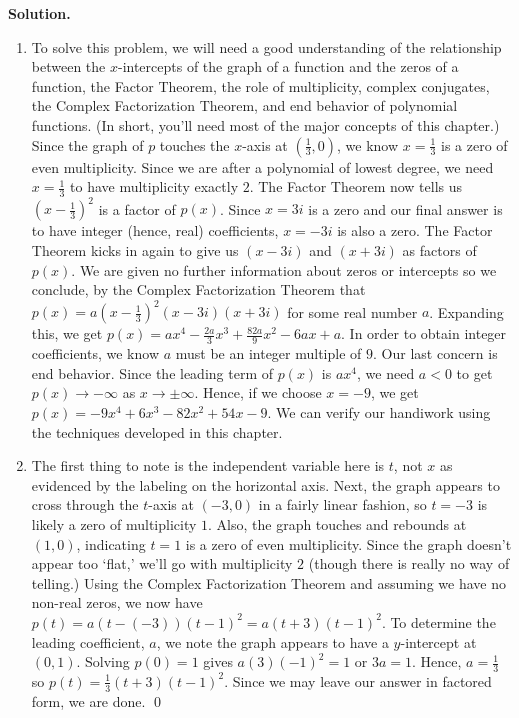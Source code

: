 \begin{ex}
{\bf Solution.}  

\begin{enumerate}

\item To solve this problem, we will need a good understanding of the relationship between the $x$-intercepts of the graph of a function and the zeros of a function, the Factor Theorem, the role of multiplicity, complex conjugates, the Complex Factorization Theorem, and end behavior of polynomial functions.  (In short, you'll need most of the major concepts of this chapter.)  Since the graph of $p$ touches the $x$-axis at $\left(\frac{1}{3}, 0\right)$, we know $x=\frac{1}{3}$ is a zero of even multiplicity.  Since we are after a polynomial of lowest degree, we need $x=\frac{1}{3}$ to have multiplicity exactly $2$. The Factor Theorem now tells us  $\left(x-\frac{1}{3}\right)^2$ is a factor of $p(x)$.  Since $x=3i$ is a zero and our final answer is to have integer (hence, real) coefficients, $x=-3i$ is also a zero.  The Factor Theorem kicks in again to give us $(x-3i)$ and $(x+3i)$ as factors of $p(x)$.  We are given no further information about zeros or intercepts so we conclude, by the Complex Factorization Theorem that $p(x) = a \left(x-\frac{1}{3}\right)^2 (x-3i)(x+3i)$ for some real number $a$.  Expanding this, we get $p(x) =  ax^4-\frac{2a}{3} x^3+\frac{82a}{9} x^2-6ax+a$.  In order to obtain integer coefficients, we know $a$ must be an integer multiple of $9$.  Our last concern is end behavior.  Since the leading term of $p(x)$ is $ax^4$, we need $a < 0$ to get $p(x) \rightarrow -\infty$ as $x \rightarrow \pm \infty$. Hence, if we choose $x=-9$, we get $p(x) = -9x^4+ 6 x^3 - 82 x^2+54x-9$.    We can verify our handiwork using the techniques developed in this chapter.  

\item The first thing to note is the independent variable here is $t$, not $x$ as evidenced by the labeling on the horizontal axis.   Next, the graph appears to cross through the $t$-axis at $(-3,0)$ in a fairly linear fashion, so $t=-3$ is likely a zero of multiplicity $1$.   Also, the graph touches and rebounds at $(1,0)$, indicating $t=1$ is a zero of even multiplicity.  Since the graph doesn't appear too `flat,' we'll go with multiplicity $2$ (though there is really no way of telling.)     Using the Complex Factorization Theorem and assuming we have no non-real zeros, we now have $p(t) = a (t-(-3))(t-1)^2 = a(t+3)(t-1)^2$.  To determine the leading coefficient, $a$, we note the graph appears to have a $y$-intercept at $(0,1)$.  Solving $p(0) = 1$ gives $a(3)(-1)^2 = 1$ or $3a = 1$.  Hence, $a = \frac{1}{3}$ so $p(t) = \frac{1}{3} (t+3)(t-1)^2$. Since we may leave our answer in factored form, we are done. \qed

\end{enumerate}

\end{ex}

